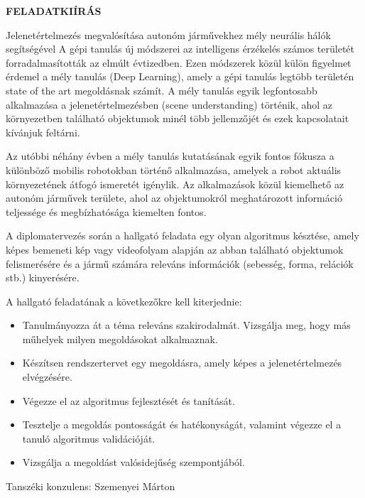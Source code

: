 \clearpage
\begin{center}
    \large
    \textbf{FELADATKIÍRÁS}\\
\end{center}


Jelenetértelmezés megvalósítása autonóm járművekhez mély neurális hálók segítségével
A gépi tanulás új módszerei az intelligens érzékelés számos területét forradalmasították az
elmúlt évtizedben. Ezen módszerek közül külön figyelmet érdemel a mély tanulás (Deep
Learning), amely a gépi tanulás legtöbb területén state of the art megoldásnak számít. A mély
tanulás egyik legfontosabb alkalmazása a jelenetértelmezésben (scene understanding)
történik, ahol az környezetben található objektumok minél több jellemzőjét és ezek
kapcsolatait kívánjuk feltárni.

Az utóbbi néhány évben a mély tanulás kutatásának egyik fontos fókusza a különböző mobilis
robotokban történő alkalmazása, amelyek a robot aktuális környezetének átfogó ismeretét
igénylik. Az alkalmazások közül kiemelhető az autonóm járművek területe, ahol az
objektumokról meghatározott információ teljessége és megbízhatósága kiemelten fontos.

A diplomatervezés során a hallgató feladata egy olyan algoritmus késztése, amely képes
bemeneti kép vagy videofolyam alapján az abban található objektumok felismerésére és a
jármű számára releváns információk (sebesség, forma, relációk stb.) kinyerésére.

A hallgató feladatának a következőkre kell kiterjednie:

\begin{itemize}
    \item Tanulmányozza át a téma releváns szakirodalmát. Vizsgálja meg, hogy más műhelyek
          milyen megoldásokat alkalmaznak.
    \item Készítsen rendszertervet egy megoldásra, amely képes a jelenetértelmezés
          elvégzésére.    
    \item Végezze el az algoritmus fejlesztését és tanítását.
    \item Tesztelje a megoldás pontosságát és hatékonyságát, valamint végezze el a tanuló
    algoritmus validációját.    
    \item Vizsgálja a megoldást valósidejűség szempontjából.
\end{itemize}




Tanszéki konzulens: Szemenyei Márton 
